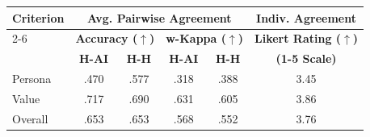 \begin{tabular}{l|cc|cc|c}
\toprule
\multirow{2}{*}{\textbf{Criterion}} & \multicolumn{4}{c|}{\textbf{Avg. Pairwise Agreement}} & \textbf{Indiv. Agreement}\\
\cmidrule(lr){2-6}
& \multicolumn{2}{c|}{\textbf{Accuracy ($\uparrow$)}} & \multicolumn{2}{c|}{\textbf{w-Kappa ($\uparrow$)}} & \textbf{Likert Rating ($\uparrow$)} \\
& \textbf{H-AI} & \textbf{H-H} & \textbf{H-AI} & \textbf{H-H} & \textbf{(1-5 Scale)} \\
\midrule
Persona & .470 & .577 & .318 & .388 & 3.45 \\
Value & .717 & .690 & .631 & .605 & 3.86 \\
Overall & .653 & .653 & .568 & .552 & 3.76 \\
\bottomrule
\end{tabular}
